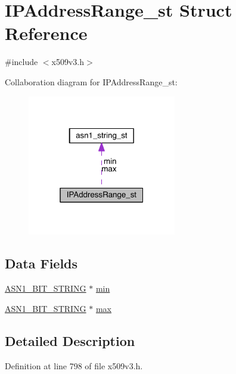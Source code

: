 \hypertarget{struct_i_p_address_range__st}{}\section{I\+P\+Address\+Range\+\_\+st Struct Reference}
\label{struct_i_p_address_range__st}


{\ttfamily \#include $<$x509v3.\+h$>$}



Collaboration diagram for I\+P\+Address\+Range\+\_\+st\+:\nopagebreak
\begin{figure}[H]
\begin{center}
\leavevmode
\includegraphics[width=184pt]{struct_i_p_address_range__st__coll__graph}
\end{center}
\end{figure}
\subsection*{Data Fields}
\begin{DoxyCompactItemize}
\item 
\hyperlink{crypto_2ossl__typ_8h_af837aaa00e151b1e8773aea5a8fe1cc4}{A\+S\+N1\+\_\+\+B\+I\+T\+\_\+\+S\+T\+R\+I\+NG} $\ast$ \hyperlink{struct_i_p_address_range__st_ac7199047cef080270fd8e6b88cb47856}{min}
\item 
\hyperlink{crypto_2ossl__typ_8h_af837aaa00e151b1e8773aea5a8fe1cc4}{A\+S\+N1\+\_\+\+B\+I\+T\+\_\+\+S\+T\+R\+I\+NG} $\ast$ \hyperlink{struct_i_p_address_range__st_ada1c031150f9202aa2ab31ba3d20b528}{max}
\end{DoxyCompactItemize}


\subsection{Detailed Description}


Definition at line 798 of file x509v3.\+h.



